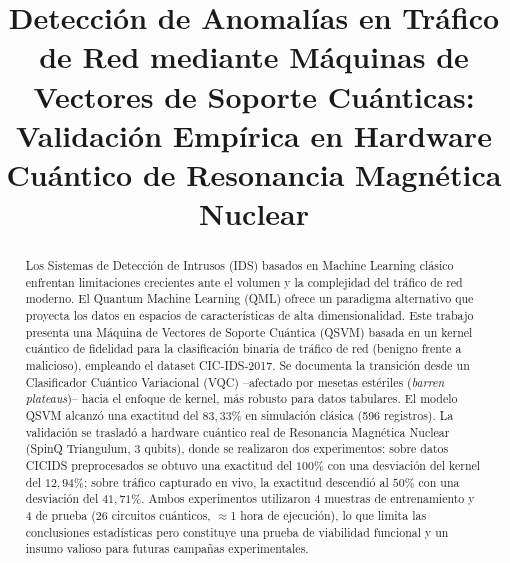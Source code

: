 \documentclass[10pt,conference]{IEEEtran}
\begin{document}
\title{Detección de Anomalías en Tráfico de Red mediante Máquinas de
Vectores de Soporte Cuánticas:\\ Validación Empírica en Hardware Cuántico
de Resonancia Magnética Nuclear}

\author{
\and
{}
\and
{}
}

\maketitle

\begin{abstract}
Los Sistemas de Detección de Intrusos (IDS) basados en Machine Learning
clásico enfrentan limitaciones crecientes ante el volumen y la
complejidad del tráfico de red moderno. El Quantum Machine Learning
(QML) ofrece un paradigma alternativo que proyecta los datos en espacios
de características de alta dimensionalidad. Este trabajo presenta una
Máquina de Vectores de Soporte Cuántica (QSVM) basada en un kernel
cuántico de fidelidad para la clasificación binaria de tráfico de red
(benigno frente a malicioso), empleando el dataset CIC-IDS-2017. Se
documenta la transición desde un Clasificador Cuántico Variacional
(VQC) --afectado por mesetas estériles (\textit{barren plateaus})--
hacia el enfoque de kernel, más robusto para datos tabulares. El modelo
QSVM alcanzó una exactitud del $83{,}33\%$ en simulación clásica
(596 registros). La validación se trasladó a hardware cuántico real de
Resonancia Magnética Nuclear (SpinQ Triangulum, 3 qubits), donde se
realizaron dos experimentos: sobre datos CICIDS preprocesados se obtuvo
una exactitud del $100\%$ con una desviación del kernel del $12{,}94\%$;
sobre tráfico capturado en vivo, la exactitud descendió al $50\%$ con
una desviación del $41{,}71\%$. Ambos experimentos utilizaron 4 muestras
de entrenamiento y 4 de prueba (26 circuitos cuánticos, $\approx$1 hora
de ejecución), lo que limita las conclusiones estadísticas pero
constituye una prueba de viabilidad funcional y un insumo valioso para
futuras campañas experimentales.
\end{abstract}
\end{document}

